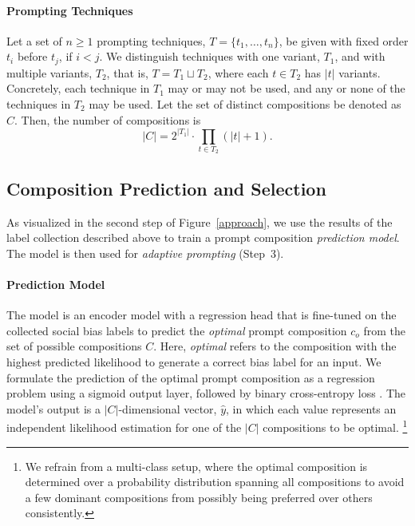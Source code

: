 \paragraph{Prompting Techniques}
Let a set of $n \geq 1$ prompting techniques, $T = \{t_1,\dots,t_n\}$, be given with fixed order $t_i$ before $t_j$, if $i<j$. We distinguish techniques with one variant, $T_{1}$, and with multiple variants, $T_{2}$, that is, $T = T_{1} \sqcup T_{2}$, where each $t \in T_{2}$ has $\vert t \vert$ variants. Concretely, each technique in $T_1$ may or may not be used, and any or none of the techniques in $T_2$ may be used.
Let the set of distinct compositions be denoted as $C$. Then, the number of compositions is
\begin{equation}
    \label{eqn:number-of-compositions}
    \vert C \vert = 2^{ \vert T_1 \vert} \cdot \prod_{t \in T_2} (\vert t \vert + 1).
\end{equation}




\subsection{Composition Prediction and Selection}
\label{sec:composition-prediction}

As visualized in the second step of Figure~\ref{approach}, we use the results of the label collection described above to train a prompt composition \emph{prediction model}. The model is then used for \emph{adaptive prompting} (Step~3).

\paragraph{Prediction Model}
The model is an encoder model with a regression head that is fine-tuned on the collected social bias labels to predict the \textit{optimal} prompt composition
$c_o$ from the set of possible compositions $C$. Here, \textit{optimal} refers to the composition with the highest predicted likelihood to generate a correct bias label for an input.
We formulate the prediction of the optimal prompt composition as a regression problem using a sigmoid output layer, followed by binary cross-entropy loss \cite{ridnik2021,grivas2024}. The model's output is a $|C|$-dimensional vector, $\hat{y}$, in which each value represents an independent likelihood estimation for one of the $|C|$ compositions to be optimal.%
\footnote{We refrain from a multi-class setup, where the optimal composition is determined over a probability distribution spanning all compositions to avoid a few dominant compositions from possibly being preferred over others consistently.}

